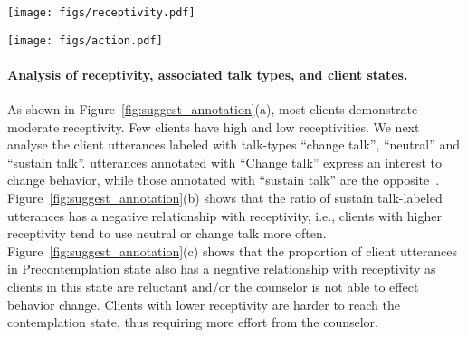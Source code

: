 \begin{figure*}[t]
    \centering
    \texttt{[image: figs/receptivity.pdf]}
    \caption{The distribution of receptivity and the relation between receptivity and sustain ratio and precontemplation.}
    \label{fig:suggest_annotation}
\end{figure*}

\begin{figure*}[tb]
    \centering
    \texttt{[image: figs/action.pdf]}
    \caption{Proportions of actions for different receptivity scores in different states. Actions negatively associated with receptivity are represented in dashed lines.}
    \label{fig:action_distribution}
\end{figure*}

\paragraph{Analysis of receptivity, associated talk types, and client states.} As shown in Figure~\ref{fig:suggest_annotation}(a), most clients demonstrate moderate receptivity. Few clients have high and low receptivities.  We next analyse the client utterances labeled with talk-types ``change talk'', ``neutral'' and ``sustain talk''. utterances annotated with ``Change talk'' express an interest to change behavior, while those annotated with ``sustain talk'' are the opposite~\citep{hoang2024can, miller2012motivational}. Figure~\ref{fig:suggest_annotation}(b) shows that the ratio of sustain talk-labeled utterances has a negative relationship with receptivity, i.e., clients with higher receptivity tend to use neutral or change talk more often.  Figure~\ref{fig:suggest_annotation}(c) shows that the proportion of client utterances in Precontemplation state also has a negative relationship with receptivity as clients in this state are reluctant and/or the counselor is not able to effect behavior change. Clients with lower receptivity are harder to reach the contemplation state, thus requiring more effort from the counselor.

